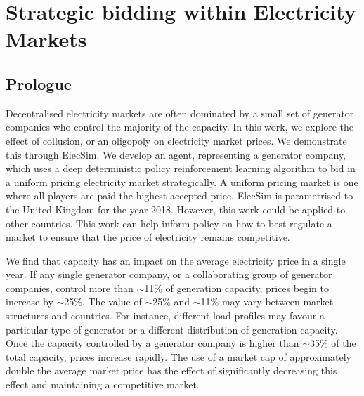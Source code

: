 \chapter{Strategic bidding within Electricity Markets}
\label{chapter:reinforcement}
\ifpdf
\graphicspath{{Chapter3/Figs/Raster/}{Chapter3/Figs/PDF/}{Chapter3/Figs/}}
\else
\graphicspath{{Chapter3/Figs/Vector/}{Chapter3/Figs/}}
\fi


\section*{Prologue}


Decentralised electricity markets are often dominated by a small set of generator companies who control the majority of the capacity. In this work, we explore the effect of collusion, or an oligopoly on electricity market prices. We demonstrate this through ElecSim. We develop an agent, representing a generator company, which uses a deep deterministic policy reinforcement learning algorithm to bid in a uniform pricing electricity market strategically. A uniform pricing market is one where all players are paid the highest accepted price. ElecSim is parametrised to the United Kingdom for the year 2018. However, this work could be applied to other countries. This work can help inform policy on how to best regulate a market to ensure that the price of electricity remains competitive.

We find that capacity has an impact on the average electricity price in a single year. If any single generator company, or a collaborating group of generator companies, control more than ${\sim}$11$\%$ of generation capacity, prices begin to increase by ${\sim}$25$\%$. The value of ${\sim}$25\% and ${\sim}$11\% may vary between market structures and countries. For instance, different load profiles may favour a particular type of generator or a different distribution of generation capacity. Once the capacity controlled by a generator company is higher than ${\sim}$35\% of the total capacity, prices increase rapidly. The use of a market cap of approximately double the average market price has the effect of significantly decreasing this effect and maintaining a competitive market.

